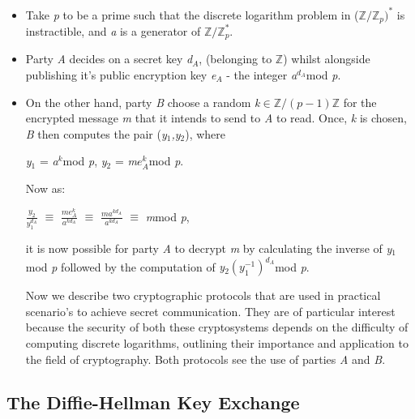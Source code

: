 \documentclass[iwp,first]{luthesis}
\begin{document}
\begin{itemize}

\item Take \textit{p} to be a prime such that the discrete logarithm problem in ($\mathbb{Z}/\mathbb{Z}_p)^*$ is instractible, and \textit{a} is a generator of $\mathbb{Z}/\mathbb{Z}_{p}^*$.

\item Party \textit{A} decides on a secret key \textit{d$_A$}, (belonging to $\mathbb{Z}$) whilst alongside publishing it's public encryption key \textit{e$_A$} - the integer \textit{a$^{d_A}$}mod \textit{p}. 

\item On the other hand, party \textit{B} choose a random \textit{k}$\in\mathbb{Z}/(p-1)\mathbb{Z}$ for the encrypted message \textit{m} that it intends to send to \textit{A} to read. Once, \textit{k} is chosen, \textit{B} then computes the pair (\textit{y$_1$,y$_2$}), where

\begin{center}
\textit{y$_1$} = \textit{a$^k$}mod \textit{p}, \textit{y$_2$} = \textit{m$e^{k}_{A}$}mod \textit{p}.
\end{center}

Now as:

\begin{center}
\textit{$\frac{y_2}{y_1^{d_A}}$} $\equiv$ \textit{$\frac{me^{k}_{A}}{a^{kd_A}}$} $\equiv$ \textit{$\frac{ma^{kd_A}}{a^{kd_A}}$} $\equiv$ \textit{m}mod \textit{p},
\end{center}

it is now possible for party \textit{A} to decrypt \textit{m} by calculating the inverse of \textit{y$_1$}mod \textit{p} followed by the computation of \textit{y$_2(y_1^{-1})^{d_A}$}mod \textit{p}.

Now we describe two cryptographic protocols that are used in practical scenario's to achieve secret communication. They are of particular interest because the security of both these cryptosystems depends on the difficulty of computing discrete logarithms, outlining their importance and application to the field of cryptography. Both protocols see the use of parties \textit{A} and \textit{B}.

\end{itemize}

\subsection{The Diffie-Hellman Key Exchange}
\end{document}
